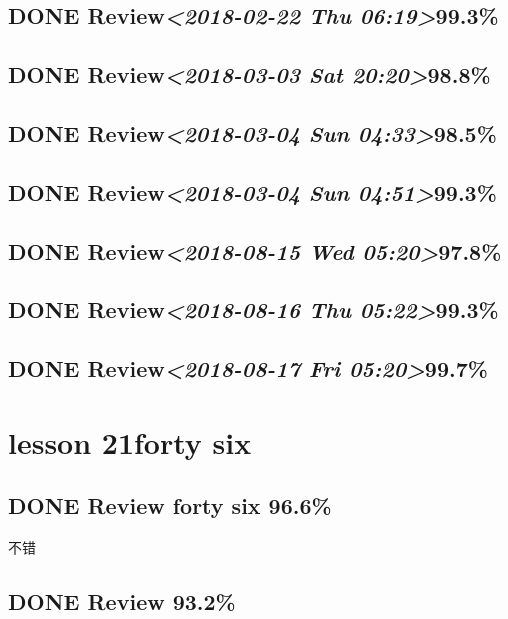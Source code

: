 \documentclass[11pt]{ctexart}
\begin{document}
\subsection{{\bfseries\sffamily DONE} Review\textit{<2018-02-22 Thu 06:19>}99.3\%}
\label{sec:org97a072a}
\subsection{{\bfseries\sffamily DONE} Review\textit{<2018-03-03 Sat 20:20>}98.8\%}
\label{sec:org9f5673e}
\subsection{{\bfseries\sffamily DONE} Review\textit{<2018-03-04 Sun 04:33>}98.5\%}
\label{sec:orgcf678d9}
\subsection{{\bfseries\sffamily DONE} Review\textit{<2018-03-04 Sun 04:51>}99.3\%}
\label{sec:org6b67cd8}
\subsection{{\bfseries\sffamily DONE} Review\textit{<2018-08-15 Wed 05:20>}97.8\%}
\label{sec:org4a4c719}
\subsection{{\bfseries\sffamily DONE} Review\textit{<2018-08-16 Thu 05:22>}99.3\%}
\label{sec:orgfa45d9d}
\subsection{{\bfseries\sffamily DONE} Review\textit{<2018-08-17 Fri 05:20>}99.7\%}
\label{sec:orgb86e267}
\section{lesson 21forty six}
\label{sec:orgc2d71f2}
\subsection{{\bfseries\sffamily DONE} Review forty six 96.6\%}
\label{sec:orgc67382a}
不错

\subsection{{\bfseries\sffamily DONE} Review 93.2\%}
\label{sec:org6c7a5b9}
\end{document}

